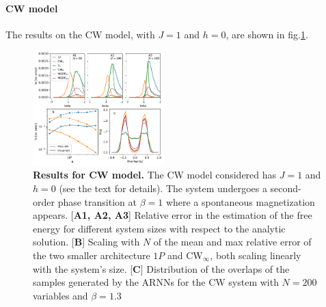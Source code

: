 \documentclass[aps,physrev,10pt,floatfix,reprint]{revtex4-2}
\begin{document}
\paragraph{CW model}
The results on the CW model, with $J=1$ and $h=0$, are shown in fig.\ref{fig:curie_weiss}. 
\begin{figure}[h]
    \centering
    \includegraphics[width=0.45\textwidth]{img/CW_res.pdf}
    \caption{\textbf{Results for CW model.} The CW model considered has $J=1$ and $h=0$ (see the text for details). The system undergoes a second-order phase transition at $\beta=1$ where a spontaneous magnetization appears\cite{kadanoff2000statistical}. [\textbf{A1, A2, A3}] Relative error in the estimation of the free energy for different system sizes with respect to the analytic solution. [\textbf{B}] Scaling with $N$ of the mean and max relative error of the two smaller architecture $1P$ and CW$_{\infty}$, both scaling linearly with the system's size. [\textbf{C}] Distribution of the overlaps of the samples generated by the ARNNs for the CW system with $N=200$ variables and $\beta=1.3$}
    \label{fig:curie_weiss}
\end{figure} 
\end{document}

